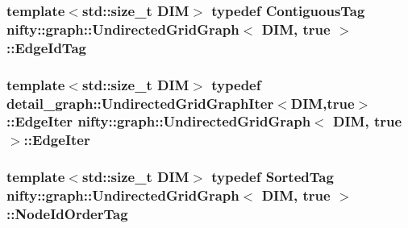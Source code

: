 \subsubsection[{Edge\+Id\+Tag}]{\setlength{\rightskip}{0pt plus 5cm}template$<$std\+::size\+\_\+t D\+I\+M$>$ typedef {\bf Contiguous\+Tag} {\bf nifty\+::graph\+::\+Undirected\+Grid\+Graph}$<$ D\+I\+M, true $>$\+::{\bf Edge\+Id\+Tag}}\label{classnifty_1_1graph_1_1UndirectedGridGraph_3_01DIM_00_01true_01_4_a0d9a24c893bf3f5f0cd61873bb77dfe1}
\hypertarget{classnifty_1_1graph_1_1UndirectedGridGraph_3_01DIM_00_01true_01_4_adc2fd416d91079b5450887b0c2c3cf05}{}
\subsubsection[{Edge\+Iter}]{\setlength{\rightskip}{0pt plus 5cm}template$<$std\+::size\+\_\+t D\+I\+M$>$ typedef {\bf detail\+\_\+graph\+::\+Undirected\+Grid\+Graph\+Iter}$<$D\+I\+M,true$>$\+::{\bf Edge\+Iter} {\bf nifty\+::graph\+::\+Undirected\+Grid\+Graph}$<$ D\+I\+M, true $>$\+::{\bf Edge\+Iter}}\label{classnifty_1_1graph_1_1UndirectedGridGraph_3_01DIM_00_01true_01_4_adc2fd416d91079b5450887b0c2c3cf05}
\hypertarget{classnifty_1_1graph_1_1UndirectedGridGraph_3_01DIM_00_01true_01_4_accf075c1b2a1820d15eea368562c93aa}{}
\subsubsection[{Node\+Id\+Order\+Tag}]{\setlength{\rightskip}{0pt plus 5cm}template$<$std\+::size\+\_\+t D\+I\+M$>$ typedef {\bf Sorted\+Tag} {\bf nifty\+::graph\+::\+Undirected\+Grid\+Graph}$<$ D\+I\+M, true $>$\+::{\bf Node\+Id\+Order\+Tag}}\label{classnifty_1_1graph_1_1UndirectedGridGraph_3_01DIM_00_01true_01_4_accf075c1b2a1820d15eea368562c93aa}
\hypertarget{classnifty_1_1graph_1_1UndirectedGridGraph_3_01DIM_00_01true_01_4_a35ae15ae07ebf58ef26916b417fba878}{}
